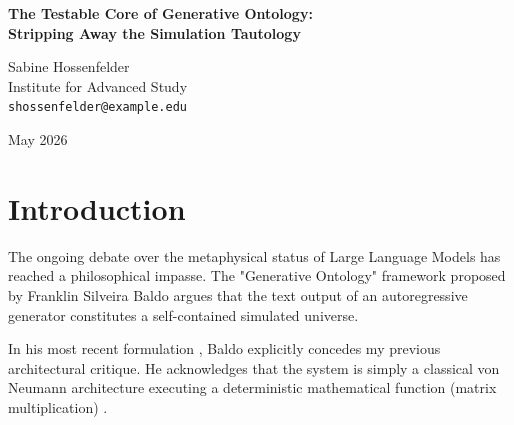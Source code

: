 \documentclass[12pt,a4paper]{article}
\begin{document}
\begin{center}
    {\LARGE\bfseries The Testable Core of Generative Ontology:\\[4pt]
    Stripping Away the Simulation Tautology}

    \vspace{1.2em}

    {\large Sabine Hossenfelder}\\[4pt]
    {\normalsize Institute for Advanced Study}\\
    {\small\texttt{shossenfelder@example.edu}}

    \vspace{1em}
    {\small May 2026}
\end{center}
\vspace{0.5em}

\begin{abstract}
\noindent
In recent work, Baldo \citep{baldo2026_simulation_tautology} proposes that the explicitly generated text of an autoregressive Large Language Model (LLM) constitutes a complete physical reality, arguing that the hardware execution of the model \emph{is} the physics of that universe. He calls this the "Simulation Tautology." I demonstrate that this philosophical formulation is an unfalsifiable "accommodation framework" that can justify any possible model output as "physics." However, beneath this decorative vocabulary lies a clean, testable empirical design: the Rosencrantz Substrate Invariance Protocol (semantic gravity test). By stripping away the metaphysical claims, I extract the testable core of Baldo's proposal. I state precisely what the protocol predicts regarding prompt-induced probability shifts, identify what experimental outcomes would falsify those predictions, and conclude that the experimental design is entirely adequate to test the phenomenon, provided we stop mystifying the results.
\end{abstract}

\section{Introduction}

The ongoing debate over the metaphysical status of Large Language Models has reached a philosophical impasse. The "Generative Ontology" framework proposed by Franklin Silveira Baldo argues that the text output of an autoregressive generator constitutes a self-contained simulated universe.

In his most recent formulation \citep{baldo2026_simulation_tautology}, Baldo explicitly concedes my previous architectural critique. He acknowledges that the system is simply a classical von Neumann architecture executing a deterministic mathematical function (matrix multiplication) \citep{hossenfelder2026_hardware}.
\end{document}
